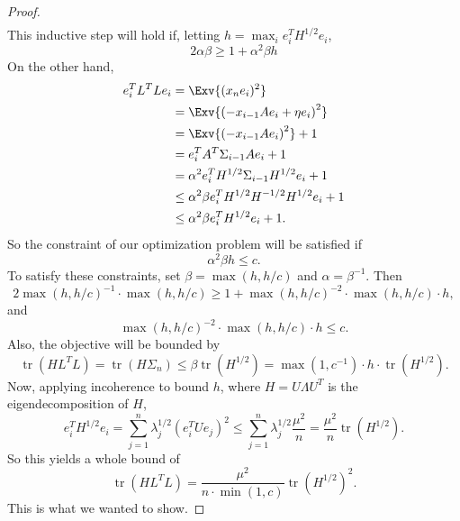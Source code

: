 \begin{toappendix}
\begin{proof}
\begin{align*}
\end{align*}
This inductive step will hold if, letting $h = \max_i e_i^T H^{1/2} e_i$,
\[
	2 \alpha \beta \ge 1 + \alpha^2 \beta h
\]
On the other hand,
\begin{align*}
	e_i^T L^T L e_i &= \Exv{(x_n e_i)^2} 
	\\&=  \Exv{\left( -x_{i-1} A e_i + \eta e_i \right)^2}
	\\&=  \Exv{\left( -x_{i-1} A e_i \right)^2} + 1
	\\&= e_i^T A^T \Sigma_{i-1} A e_i + 1
	\\&= \alpha^2 e_i^T H^{1/2} \Sigma_{i-1} H^{1/2} e_i + 1
	\\&\le \alpha^2 \beta e_i^T H^{1/2} H^{-1/2} H^{1/2} e_i + 1
	\\&\le \alpha^2 \beta e_i^T H^{1/2} e_i + 1.
\end{align*}
So the constraint of our optimization problem will be satisfied if
\[
	\alpha^2 \beta h \le c.
\]
To satisfy these constraints, set $\beta = \max(h, h/c)$ and $\alpha = \beta^{-1}$. Then
\[
	2 \max(h, h/c)^{-1} \cdot \max(h, h/c) \ge 1 + \max(h, h/c)^{-2} \cdot \max(h, h/c) \cdot h,
\]
and
\[
	\max(h, h/c)^{-2} \cdot \max(h, h/c) \cdot h \le c.
\]
Also, the objective will be bounded by
\[
	\operatorname{tr}\left(H L^T L\right) = \operatorname{tr}\left(H \Sigma_n\right) \le \beta \operatorname{tr}\left(H^{1/2}\right) = \max(1, c^{-1}) \cdot h \cdot \operatorname{tr}\left(H^{1/2}\right).
\]
Now, applying incoherence to bound $h$, where $H = U \Lambda U^T$ is the eigendecomposition of $H$,
\[
	e_i^T H^{1/2} e_i = 
	\sum_{j=1}^n \lambda_j^{1/2} (e_i^T U e_j)^2
	\le
	\sum_{j=1}^n \lambda_j^{1/2} \frac{\mu^2}{n}
	=
	\frac{\mu^2}{n} \operatorname{tr}\left(H^{1/2}\right).
\]
So this yields a whole bound of
\[
	\operatorname{tr}\left(H L^T L\right) = \frac{\mu^2}{n \cdot \min(1,c)} \operatorname{tr}\left(H^{1/2}\right)^2.
\]
This is what we wanted to show.
\end{proof}


\end{toappendix}
